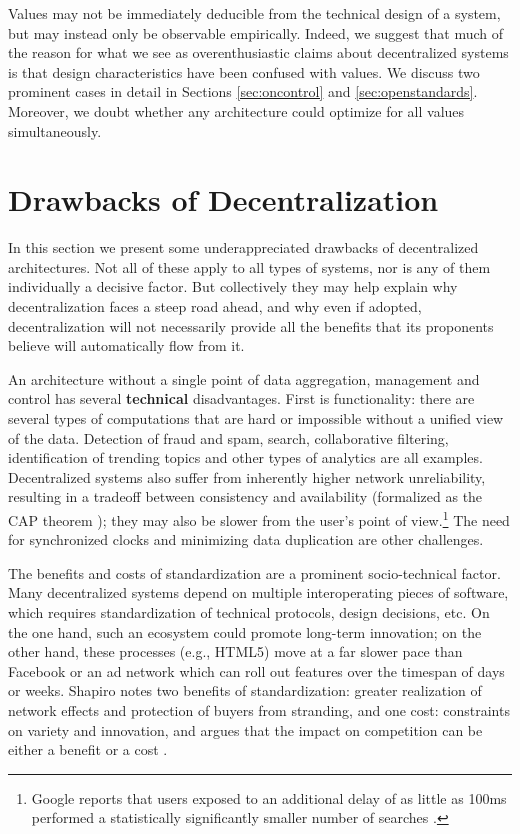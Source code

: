 \documentclass{acm_proc_article-sp}
\begin{document}
Values may not be immediately deducible from the technical design of a system, but may instead only be observable empirically. Indeed, we suggest that much of the reason for what we see as overenthusiastic claims about decentralized systems is that design characteristics have been confused with values. We discuss two prominent cases in detail in Sections \ref{sec:oncontrol} and \ref{sec:openstandards}. Moreover, we doubt whether any architecture could optimize for all values simultaneously.

\section{Drawbacks of Decentralization}
\label{sec:Drawbacks}

In this section we present some underappreciated drawbacks of decentralized architectures. Not all of these apply to all types of systems, nor is any of them individually a decisive factor. But collectively they may help explain why decentralization faces a steep road ahead, and why even if adopted, decentralization will not necessarily provide all the benefits that its proponents believe will automatically flow from it.

An architecture without a single point of data aggregation, management and control has several {\bf technical} disadvantages. First is functionality: there are several types of computations that are hard or impossible without a unified view of the data. Detection of fraud and spam, search, collaborative filtering, identification of trending topics and other types of analytics are all examples. Decentralized systems also suffer from inherently higher network unreliability, resulting in a tradeoff between consistency and availability (formalized as the CAP theorem \cite{WP:CAP}); they may also be slower from the user's point of view.\footnote{Google reports that users exposed to an additional delay of as little as 100ms performed a statistically significantly smaller number of searches \cite{speedmatters}.} The need for synchronized clocks and minimizing data duplication are other challenges.

The benefits and costs of standardization are a prominent socio-technical factor. Many decentralized systems depend on multiple interoperating pieces of software, which requires standardization of technical protocols, design decisions, etc. On the one hand, such an ecosystem could promote long-term innovation; on the other hand, these processes (e.g., HTML5) move at a far slower pace than Facebook or an ad network which can roll out features over the timespan of days or weeks. Shapiro notes two benefits of standardization: greater realization of network effects and protection of buyers from stranding, and one cost: constraints on variety and innovation, and argues that the impact on competition can be either a benefit or a cost \cite{shapiro}. 
\end{document}
